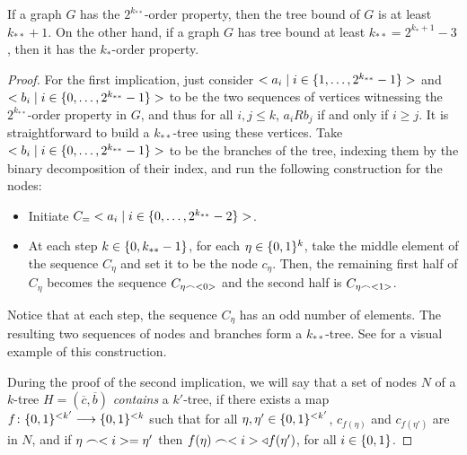     \begin{theorem} \label{thm:tree_implies_order}
        If a graph $G$ has the $2^{k_{**}}$-order property, then the tree bound of $G$ is at least $k_{**} + 1$.
        On the other hand, if a graph $G$ has tree bound at least $k_{**} = 2^{k_*+1}-3$, then it has the $k_*$-order
        property.
        \begin{proof}
            For the first implication, just consider $< a_i \mid i \in \{ 1, \dots, 2^{k_{**}}-1 \} >$ and
            $< b_i \mid i \in \{ 0, \dots, 2^{k_{**}}-1 \} >$ to be the two sequences of vertices witnessing the
            $2^{k_{**}}$-order property in $G$, and thus for all $i,j \leq k$, $a_i R b_j$ if and only if $i \geq j$.
            It is straightforward to build a $k_{**}$-tree using these vertices.
            Take $< b_i \mid i \in \{ 0, \dots, 2^{k_{**}}-1 \} >$ to be the branches of the tree, indexing them by
            the binary decomposition of their index, and run the following construction for the nodes:
            \begin{itemize}
                \item Initiate $C_\empty = \partriangle{a_i \mid i \in \parcurly{0, \dots, 2^{k_{**}}-2}}$.
                \item At each step $k \in \{ 0, k_{**}-1 \}$, for each $\eta \in \{ 0,1 \}^k$, take the middle
                    element of the sequence $C_\eta$ and set it to be the node $c_\eta$.
                    Then, the remaining first half of $C_\eta$ becomes the sequence $C_{\eta \frown < 0 >}$
                    and the second half is $C_{\eta \frown < 1 >}$.
            \end{itemize}
            Notice that at each step, the sequence $C_\eta$ has an odd number of elements.
            The resulting two sequences of nodes and branches form a $k_{**}$-tree.
            See  for a visual example of this construction.

            During the proof of the second implication, we will say that a set of nodes $N$ of a $k$-tree
            $H = (\overline{c},\overline{b})$ \emph{contains} a $k'$-tree, if there exists a map
            $f \colon \{ 0,1 \}^{<k'} \longrightarrow \{ 0,1 \}^{<k}$ such that for all $\eta, \eta' \in \{ 0,1 \}^{<k'}$,
            $c_{f(\eta)}$ and $c_{f(\eta')}$ are in $N$, and if $\eta \frown < i > = \eta'$ then
            $f(\eta) \frown < i > \triangleleft f(\eta')$, for all $i \in \{ 0, 1 \}$.


\end{proof}
\end{theorem}
